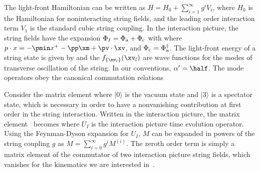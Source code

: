The light-front Hamiltonian can be written as $H = H_0 +
\sum_{i=1}^{\infty} g^i V_i$, where $H_0$ is the Hamiltonian for
noninteracting string fields, and the leading order interaction term
$V_1$ is the standard cubic string coupling.  In the interaction
picture, the string fields have the expansion
$\Phi_I = \Phi_{\rm a} + \Phi_{\rm c}$ with
\eqn{}
where $p \cdot x = -\pmin x^+ - \pp \xm + \pv \cdot \xv$,
and $\Phi_{\rm c} = \Phi_{\rm a}^\dagger$.
The
light-front energy of a string state is given by
\eqn{}
and the $f_{ \{ \nv_l \} }( \xv_l)$ are wave functions for the modes
of transverse oscillation of the string.  In our conventions,
$\alpha' = \half$.  The mode operators obey the canonical commutation
relations
\eqn{}

Consider the matrix element
\eqn{}
where $|0\rangle$ is the vacuum state and $|3\rangle$ is a spectator
state, which is necessary in order to have a nonvanishing
contribution at first order in the string interaction.  Written in
the interaction picture, the matrix element \Mdef\ becomes
\eqn{}
where $U_I$ is the interaction picture time evolution operator.
Using the Feynman-Dyson expansion for $U_I$, $M$ can be expanded in
powers of the string coupling $g$ as $M = \sum_{i=0}^{\infty} g^i
M^{(i)}$.  The zeroth order term is simply a matrix element of the
commutator of two interaction picture string fields,
\eqn{}
which vanishes for the kinematics we are interested
in~.

